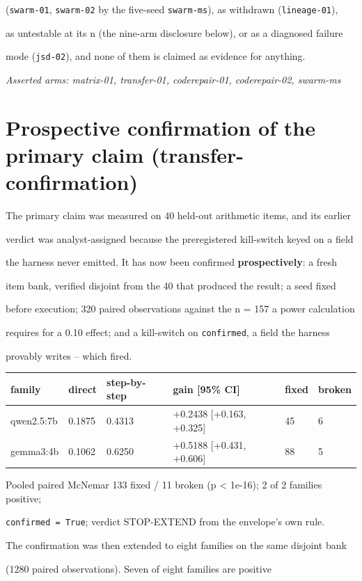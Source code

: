 \documentclass[11pt]{article}
\begin{document}
(\texttt{swarm-01}, \texttt{swarm-02} by the five-seed \texttt{swarm-ms}), as withdrawn (\texttt{lineage-01}),

as untestable at its n (the nine-arm disclosure below), or as a diagnosed failure

mode (\texttt{jsd-02}), and none of them is claimed as evidence for anything.


{\it Asserted arms: matrix-01, transfer-01, coderepair-01, coderepair-02, swarm-ms}


\section*{Prospective confirmation of the primary claim (transfer-confirmation)}

The primary claim was measured on 40 held-out arithmetic items, and its earlier

verdict was analyst-assigned because the preregistered kill-switch keyed on a field

the harness never emitted. It has now been confirmed {\bf prospectively}: a fresh

item bank, verified disjoint from the 40 that produced the result; a seed fixed

before execution; 320 paired observations against the n = 157 a power calculation

requires for a 0.10 effect; and a kill-switch on \texttt{confirmed}, a field the harness

provably writes -- which fired.


\begin{center}\small\begin{tabular}{llllll}\hline
family & direct & step-by-step & gain [95\% CI] & fixed & broken \\
\hline
qwen2.5:7b & 0.1875 & 0.4313 & +0.2438 [+0.163, +0.325] & 45 & 6 \\
gemma3:4b & 0.1062 & 0.6250 & +0.5188 [+0.431, +0.606] & 88 & 5 \\
\end{tabular}\end{center}

Pooled paired McNemar 133 fixed / 11 broken (p < 1e-16); 2 of 2 families positive;

\texttt{confirmed = True}; verdict STOP-EXTEND from the envelope's own rule.


The confirmation was then extended to eight families on the same disjoint bank

(1280 paired observations). Seven of eight families are positive
\end{document}

